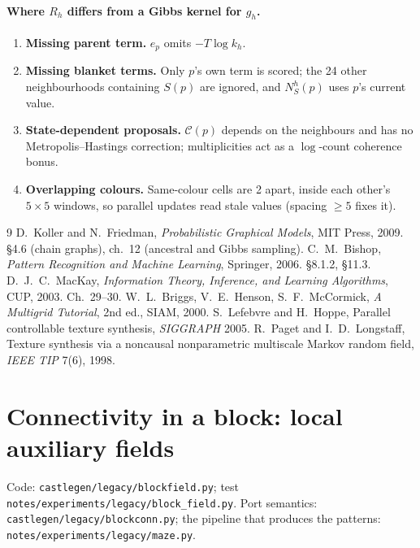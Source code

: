 \documentclass[11pt]{article}
\newcommand{\1}{\mathds{1}}
\begin{document}
\paragraph{Where $R_h$ differs from a Gibbs kernel for $g_h$.}
\begin{enumerate}
  \item \textbf{Missing parent term.} $e_p$ omits $-T\log k_h$.
  \item \textbf{Missing blanket terms.} Only $p$'s own term is scored; the 24 other
        neighbourhoods containing $S(p)$ are ignored, and $N_S^h(p)$ uses $p$'s current value.
  \item \textbf{State-dependent proposals.} $\mathcal{C}(p)$ depends on the neighbours and has
        no Metropolis--Hastings correction; multiplicities act as a $\log$-count coherence bonus.
  \item \textbf{Overlapping colours.} Same-colour cells are 2 apart, inside each other's
        $5\times5$ windows, so parallel updates read stale values (spacing $\ge 5$ fixes it).
\end{enumerate}

\begin{thebibliography}{9}
 D.~Koller and N.~Friedman, \emph{Probabilistic Graphical Models}, MIT Press,
  2009. \S4.6 (chain graphs), ch.~12 (ancestral and Gibbs sampling).
 C.~M.~Bishop, \emph{Pattern Recognition and Machine Learning}, Springer,
  2006. \S8.1.2, \S11.3.
 D.~J.~C.~MacKay, \emph{Information Theory, Inference, and Learning
  Algorithms}, CUP, 2003. Ch.~29--30.
 W.~L.~Briggs, V.~E.~Henson, S.~F.~McCormick, \emph{A Multigrid Tutorial},
  2nd ed., SIAM, 2000.
 S.~Lefebvre and H.~Hoppe, Parallel controllable texture synthesis,
  \emph{SIGGRAPH} 2005.
 R.~Paget and I.~D.~Longstaff, Texture synthesis via a noncausal nonparametric
  multiscale Markov random field, \emph{IEEE TIP} 7(6), 1998.
\end{thebibliography}

\section{Connectivity in a block: local auxiliary fields}

Code: \texttt{castlegen/legacy/blockfield.py}; test \texttt{notes/experiments/legacy/block\_field.py}.
Port semantics: \texttt{castlegen/legacy/blockconn.py}; the pipeline that produces the patterns:
\texttt{notes/experiments/legacy/maze.py}.
\end{document}
